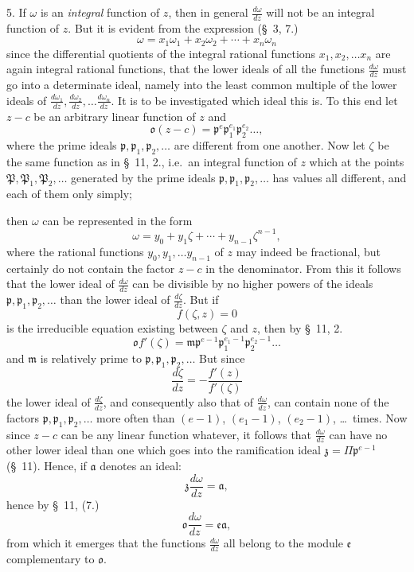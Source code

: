 \documentclass{article}
\begin{document}
5. If $\omega$ is an \emph{integral} function of $z$, then in general $\frac{d\omega}{dz}$ will not be an integral function of $z$. But it is evident from the expression (§~3, 7.)
\[ \omega = x_{1}\omega_{1} + x_{2}\omega_{2} + \cdots + x_{n}\omega_{n} \]
since the differential quotients of the integral rational functions $x_{1}, x_{2}, \ldots x_{n}$ are again integral rational functions, that the lower ideals of all the functions $\frac{d\omega}{dz}$ must go into a determinate ideal, namely into the least common multiple of the lower ideals of $\frac{d\omega_{1}}{dz}, \frac{d\omega_{2}}{dz}, \ldots \frac{d\omega_{n}}{dz}$. It is to be investigated which ideal this is. To this end let $z-c$ be an arbitrary linear function of $z$ and
\[ \mathfrak{o}(z-c) = \mathfrak{p}^{e}\mathfrak{p}_{1}^{e_{1}}\mathfrak{p}_{2}^{e_{2}}\ldots, \]
where the prime ideals $\mathfrak{p}, \mathfrak{p}_{1}, \mathfrak{p}_{2}, \ldots$ are different from one another. Now let $\zeta$ be the same function as in §~11, 2., i.e.\ an integral function of $z$ which at the points $\mathfrak{P}, \mathfrak{P}_{1}, \mathfrak{P}_{2}, \ldots$ generated by the prime ideals $\mathfrak{p}, \mathfrak{p}_{1}, \mathfrak{p}_{2}, \ldots$ has values all different, and each of them only simply;

then $\omega$ can be represented in the form
\[ \omega = y_{0} + y_{1}\zeta + \cdots + y_{n-1}\zeta^{n-1}, \]
where the rational functions $y_{0}, y_{1}, \ldots y_{n-1}$ of $z$ may indeed be fractional, but certainly do not contain the factor $z-c$ in the denominator. From this it follows that the lower ideal of $\frac{d\omega}{dz}$ can be divisible by no higher powers of the ideals $\mathfrak{p}, \mathfrak{p}_{1}, \mathfrak{p}_{2}, \ldots$ than the lower ideal of $\frac{d\zeta}{dz}$. But if
\[ f(\zeta, z) = 0 \]
is the irreducible equation existing between $\zeta$ and $z$, then by §~11, 2.
\[ \mathfrak{o}f'(\zeta) = \mathfrak{m}\mathfrak{p}^{e-1}\mathfrak{p}_{1}^{e_{1}-1}\mathfrak{p}_{2}^{e_{2}-1}\ldots \]
and $\mathfrak{m}$ is relatively prime to $\mathfrak{p}, \mathfrak{p}_{1}, \mathfrak{p}_{2}, \ldots$ But since
\[ \frac{d\zeta}{dz} = -\frac{f'(z)}{f'(\zeta)} \]
the lower ideal of $\frac{d\zeta}{dz}$, and consequently also that of $\frac{d\omega}{dz}$, can contain none of the factors $\mathfrak{p}, \mathfrak{p}_{1}, \mathfrak{p}_{2}, \ldots$ more often than $(e-1)$, $(e_{1}-1)$, $(e_{2}-1)$, \ldots\ times. Now since $z-c$ can be any linear function whatever, it follows that $\frac{d\omega}{dz}$ can have no other lower ideal than one which goes into the ramification ideal $\mathfrak{z} = \Pi\mathfrak{p}^{e-1}$ (§~11). Hence, if $\mathfrak{a}$ denotes an ideal:
\[ \mathfrak{z}\frac{d\omega}{dz} = \mathfrak{a}, \]
hence by §~11, (7.)
\[ \mathfrak{o}\frac{d\omega}{dz} = \mathfrak{e}\mathfrak{a}, \]
from which it emerges that the functions $\frac{d\omega}{dz}$ all belong to the module $\mathfrak{e}$ complementary to $\mathfrak{o}$.
\end{document}
